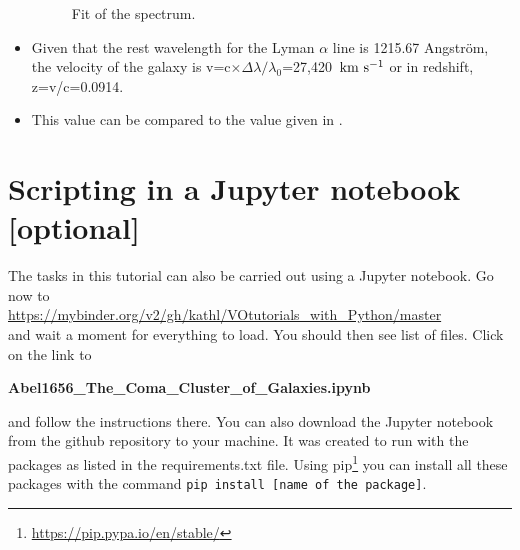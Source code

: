 \documentclass [a4paper, 12pt]{article}
\begin{document}
\begin{itemize}
\begin{figure}[H]
\caption{Fit of the spectrum.}
\label{fig:specfit}
\end{figure}
\item Given that the rest wavelength for the Lyman $\alpha$ line is 1215.67 Angstr\"om, the velocity of the galaxy is v=c$\times\Delta\lambda/\lambda_0$=27,420~$\rm km\ s^{-1}$ or in redshift, z=v/c=0.0914.

\item This value can be compared to the value given in \simbad.
\end{itemize}

\section{Scripting in a Jupyter notebook [optional]}

The tasks in this tutorial can also be carried out using a Jupyter notebook.
Go now to\\
\url{https://mybinder.org/v2/gh/kathl/VOtutorials_with_Python/master}\\
and wait a moment for everything to load. You should then see list of files.
Click on the link to

\textbf{Abel1656\_The\_Coma\_Cluster\_of\_Galaxies.ipynb}

\noindent and follow the instructions there. You can also download the Jupyter
notebook from the github repository to your machine. It was created to run with
the packages as listed in the requirements.txt file. Using
pip\footnote{\url{https://pip.pypa.io/en/stable/}} you can install all these
packages with the command \texttt{pip install [name of the package]}.

%
\end{document}
